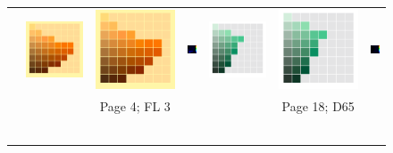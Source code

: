 \begin{figure}[ht!]
{\begin{tabular}{ccccccc}
			\\ \raisebox{0.5cm}[0pt][0pt]{\parbox[c][0pt][c]{0cm}{\hspace{-1.5em}\\[20pt]}\par}
			&
			\includegraphics[width=.15\linewidth]{img/results_uplift_page04_originalFL3.png}
			&
			\includegraphics[width=.15\linewidth]{img/results_uplift_page04_ourFL3.png}
			& 
			\includegraphics[width=.15\linewidth,height=5.25em]{img/results_uplift_page04_diff_ourFL3.png}
			&\quad
			\includegraphics[width=.15\linewidth]{img/results_uplift_page18_originalD65.png}
			&
			\includegraphics[width=.15\linewidth]{img/results_uplift_page18_ourD65.png}
			&
			\includegraphics[width=.15\linewidth,height=5.25em]{img/results_uplift_page18_diff_ourD65.png}\\
			& & Page 4; FL 3 & & & Page 18; D65 & \\
			\vspace{0.1em} \\ 
			\raisebox{0.4cm}[0pt][0pt]{\parbox[c][0pt][c]{0cm}{\hspace{-1.5em}\\[20pt]}\par}

\end{tabular}}
\end{figure}
